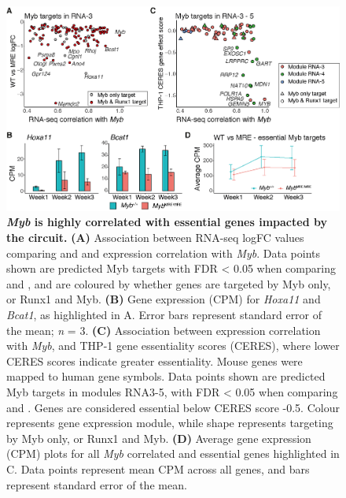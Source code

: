 \begin{figure}[!t]
    \centering
    \includegraphics[width=\textwidth,height=\textheight,keepaspectratio]{figures/chapter5/ch5_essential-targets.png}
    \caption[{\textit{Myb} is highly correlated with essential genes impacted by the \mybmre{} circuit.}]
    {\textbf{\textit{Myb} is highly correlated with essential genes impacted by the \mybmre{} circuit.}
    \textbf{(A)} Association between RNA-seq logFC values comparing \mybwt{} and \mybmre{} and expression correlation with \textit{Myb}. Data points shown are predicted Myb targets with FDR < 0.05 when comparing \mybwt{} and \mybmre{}, and are coloured by whether genes are targeted by Myb only, or Runx1 and Myb. 
    \textbf{(B)} Gene expression (CPM) for \textit{Hoxa11} and \textit{Bcat1}, as highlighted in A. Error bars represent standard error of the mean; \textit{n} = 3. 
    \textbf{(C)} Association between expression correlation with \textit{Myb}, and THP-1 gene essentiality scores (CERES), where lower CERES scores indicate greater essentiality. Mouse genes were  mapped to human gene symbols. Data points shown are predicted Myb targets in modules RNA3-5, with FDR < 0.05 when comparing \mybwt{} and \mybmre{}. Genes are considered essential below CERES score -0.5. Colour represents gene expression module, while shape represents targeting by Myb only, or Runx1 and Myb. 
    \textbf{(D)} Average gene expression (CPM) plots for all \textit{Myb} correlated and essential genes highlighted in C. Data points represent mean CPM across all genes, and bars represent standard error of the mean.  
    }
    \label{fig:ch5_essential-targets}
\end{figure}

